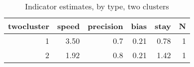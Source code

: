 \begin{table}

\caption{\label{tab:}Indicator estimates, by type, two clusters}
\centering
\begin{tabular}[t]{rrrrrr}
\toprule
twocluster & speed & precision & bias & stay & N\\
\midrule
1 & 3.50 & 0.7 & 0.21 & 0.78 & 1\\
2 & 1.92 & 0.8 & 0.21 & 1.42 & 1\\
\bottomrule
\end{tabular}
\end{table}
